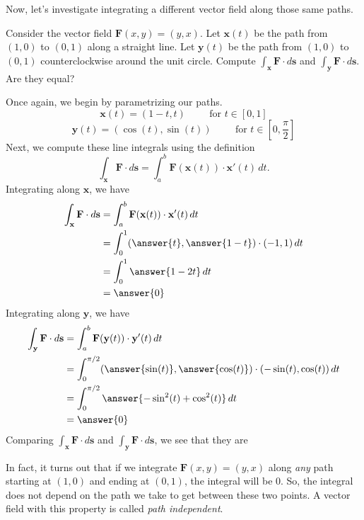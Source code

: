 \documentclass{ximera}
\begin{document}
Now, let's investigate integrating a different vector field along those same paths.

\begin{example}
Consider the vector field $\textbf{F}(x,y) = (y,x)$. Let $\textbf{x}(t)$ be the path from $(1,0)$ to $(0,1)$ along a straight line. Let $\textbf{y}(t)$ be the path from $(1,0)$ to $(0,1)$ counterclockwise around the unit circle. Compute $\int_\textbf{x} \textbf{F}\cdot d\textbf{s}$ and $\int_\textbf{y} \textbf{F}\cdot d\textbf{s}$. Are they equal?
\begin{explanation}
Once again, we begin by parametrizing our paths.
\[
\textbf{x}(t)= (1-t,t)\hspace{1cm}\textrm{for }t\in[0,1]
\]
\[
\textbf{y}(t)= (\cos(t),\sin(t))\hspace{1cm}\textrm{for }t\in[0,\frac{\pi}{2}]
\]
Next, we compute these line integrals using the definition
\[
\int_\textbf{x} \textbf{F}\cdot d\textbf{s} = \int_a^b\textbf{F}(\textbf{x}(t))\cdot \textbf{x}'(t)\,dt.
\]
Integrating along $\textbf{x}$, we have
\begin{align*}
\int_\textbf{x} \textbf{F}\cdot d\textbf{s} &= \int_a^b\textbf{F}(\textbf{x}(t))\cdot \textbf{x}'(t)\,dt\\
&= \int_{0}^{1}(\answer{t},\answer{1-t})\cdot(-1, 1)\,dt\\
&= \int_{0}^{1}\answer{1-2t}\,dt\\
&= \answer{0}
\end{align*}
Integrating along $\textbf{y}$, we have
\begin{align*}
\int_\textbf{y} \textbf{F}\cdot d\textbf{s} &= \int_a^b\textbf{F}(\textbf{y}(t))\cdot \textbf{y}'(t)\,dt\\
&= \int_{0}^{\pi/2}(\answer{\sin(t)},\answer{\cos(t)})\cdot(-\sin(t), \cos(t))\,dt\\
&= \int_{0}^{\pi/2}\answer{-\sin^2(t)+\cos^2(t)}\,dt\\
&= \answer{0}
\end{align*}
Comparing $\int_\textbf{x} \textbf{F}\cdot d\textbf{s}$ and $\int_\textbf{y} \textbf{F}\cdot d\textbf{s}$, we see that they are
\begin{multipleChoice}
\end{multipleChoice}
\end{explanation}
\end{example}

In fact, it turns out that if we integrate $\textbf{F}(x,y) = (y,x)$ along \emph{any} path starting at $(1,0)$ and ending at $(0,1)$, the integral will be $0$. So, the integral does not depend on the path we take to get between these two points. A vector field with this property is called \emph{path independent}.
\end{document}
